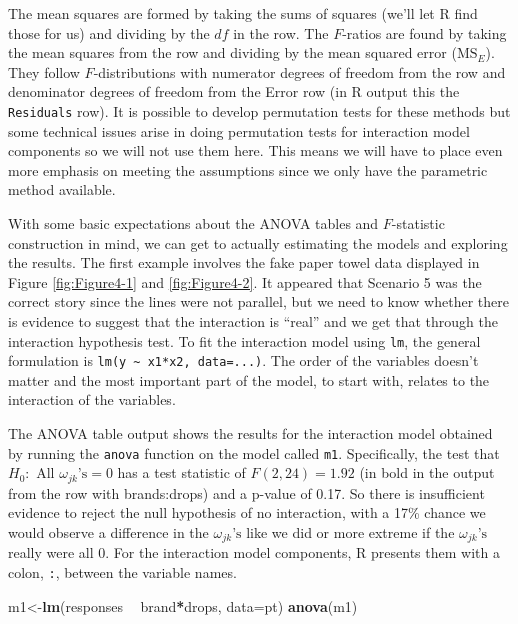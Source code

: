 \documentclass[]{book}
\newenvironment{Shaded}{\begin{snugshade}}{\end{snugshade}}
\newcommand{\KeywordTok}[1]{\textcolor[rgb]{0.13,0.29,0.53}{\textbf{#1}}}
\newcommand{\DataTypeTok}[1]{\textcolor[rgb]{0.13,0.29,0.53}{#1}}
\newcommand{\StringTok}[1]{\textcolor[rgb]{0.31,0.60,0.02}{#1}}
\newcommand{\OperatorTok}[1]{\textcolor[rgb]{0.81,0.36,0.00}{\textbf{#1}}}
\newcommand{\NormalTok}[1]{#1}
\theoremstyle{definition}
\theoremstyle{definition}
\theoremstyle{remark}
\begin{document}
The mean squares are formed by taking the sums of squares (we'll let R
find those for us) and dividing by the \(df\) in the row. The
\(F\)-ratios are found by taking the mean squares from the row and
dividing by the mean squared error (\(\text{MS}_E\)). They follow
\(F\)-distributions with numerator degrees of freedom from the row and
denominator degrees of freedom from the Error row (in R output this the
\texttt{Residuals} row). It is possible to develop permutation tests for
these methods but some technical issues arise in doing permutation tests
for interaction model components so we will not use them here. This
means we will have to place even more emphasis on meeting the
assumptions since we only have the parametric method available.

With some basic expectations about the ANOVA tables and \(F\)-statistic
construction in mind, we can get to actually estimating the models and
exploring the results. The first example involves the fake paper towel
data displayed in Figure \ref{fig:Figure4-1} and \ref{fig:Figure4-2}. It
appeared that Scenario 5 was the correct story since the lines were not
parallel, but we need to know whether there is evidence to suggest that
the interaction is ``real'' and we get that through the interaction
hypothesis test. To fit the interaction model using \texttt{lm}, the
general formulation is
\texttt{lm(y\ \textasciitilde{}\ x1*x2,\ data=...)}. The order of the
variables doesn't matter and the most important part of the model, to
start with, relates to the interaction of the variables.

The ANOVA table output shows the results for the interaction model
obtained by running the \texttt{anova} function on the model called
\texttt{m1}. Specifically, the test that
\(H_0: \text{ All } \omega_{jk}\text{'s} = 0\) has a test statistic of
\(F(2,24)=1.92\) (in bold in the output from the row with brands:drops)
and a p-value of 0.17. So there is insufficient evidence to reject the
null hypothesis of no interaction, with a 17\% chance we would observe a
difference in the \(\omega_{jk}\text{'s}\) like we did or more extreme
if the \(\omega_{jk}\text{'s}\) really were all 0. For the interaction
model components, R presents them with a colon, \texttt{:}, between the
variable names.

\begin{Shaded}
\begin{Highlighting}[]
\NormalTok{m1<-}\KeywordTok{lm}\NormalTok{(responses }\OperatorTok{~}\StringTok{ }\NormalTok{brand}\OperatorTok{*}\NormalTok{drops, }\DataTypeTok{data=}\NormalTok{pt)}
\KeywordTok{anova}\NormalTok{(m1)}
\end{Highlighting}
\end{Shaded}
\end{document}
